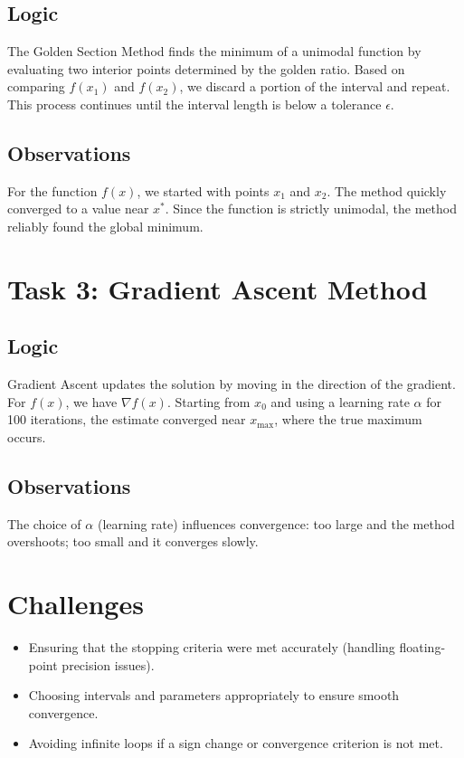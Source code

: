 \documentclass{article}
\begin{document}
\subsection{Logic}

The Golden Section Method finds the minimum of a unimodal function by evaluating two interior points determined by the golden ratio. Based on comparing \( f(x_1) \) and \( f(x_2) \), we discard a portion of the interval and repeat. This process continues until the interval length is below a tolerance \( \epsilon \).

\subsection{Observations}

For the function \( f(x) \), we started with points \( x_1 \) and \( x_2 \). The method quickly converged to a value near \( x^* \). Since the function is strictly unimodal, the method reliably found the global minimum.

\section{Task 3: Gradient Ascent Method}

\subsection{Logic}

Gradient Ascent updates the solution by moving in the direction of the gradient. For \( f(x) \), we have \( \nabla f(x) \). Starting from \( x_0 \) and using a learning rate \( \alpha \) for 100 iterations, the estimate converged near \( x_{\text{max}} \), where the true maximum occurs.

\subsection{Observations}

The choice of \( \alpha \) (learning rate) influences convergence: too large and the method overshoots; too small and it converges slowly.

\section{Challenges}

\begin{itemize}
    \item Ensuring that the stopping criteria were met accurately (handling floating-point precision issues).
    \item Choosing intervals and parameters appropriately to ensure smooth convergence.
    \item Avoiding infinite loops if a sign change or convergence criterion is not met.
\end{itemize}
\end{document}
